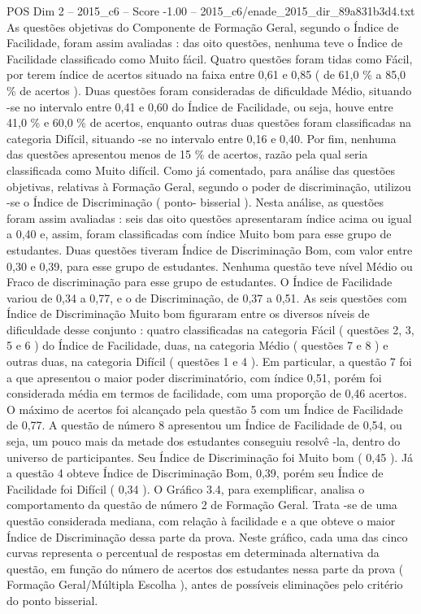 \begin{textsample}{POS Dim 2 – 2015\_c6 – Score -1.00 – 2015\_c6/enade\_2015\_dir\_89a831b3d4.txt}
As questões objetivas do Componente de Formação Geral, segundo o Índice de Facilidade, foram assim avaliadas : das oito questões, nenhuma teve o Índice de Facilidade classificado como Muito fácil.
Quatro questões foram tidas como Fácil, por terem índice de acertos situado na faixa entre 0,61 e 0,85 ( de 61,0 \% a 85,0 \% de acertos ).
Duas questões foram consideradas de dificuldade Médio, situando -se no intervalo entre 0,41 e 0,60 do Índice de Facilidade, ou seja, houve entre 41,0 \% e 60,0 \% de acertos, enquanto outras duas questões foram classificadas na categoria Difícil, situando -se no intervalo entre 0,16 e 0,40.
Por fim, nenhuma das questões apresentou menos de 15 \% de acertos, razão pela qual seria classificada como Muito difícil.
Como já comentado, para análise das questões objetivas, relativas à Formação Geral, segundo o poder de discriminação, utilizou -se o Índice de Discriminação ( ponto- bisserial ).
Nesta análise, as questões foram assim avaliadas : seis das oito questões apresentaram índice acima ou igual a 0,40 e, assim, foram classificadas com índice Muito bom para esse grupo de estudantes.
Duas questões tiveram Índice de Discriminação Bom, com valor entre 0,30 e 0,39, para esse grupo de estudantes.
Nenhuma questão teve nível Médio ou Fraco de discriminação para esse grupo de estudantes.
O Índice de Facilidade variou de 0,34 a 0,77, e o de Discriminação, de 0,37 a 0,51.
As seis questões com Índice de Discriminação Muito bom figuraram entre os diversos níveis de dificuldade desse conjunto : quatro classificadas na categoria Fácil ( questões 2, 3, 5 e 6 ) do Índice de Facilidade, duas, na categoria Médio ( questões 7 e 8 ) e outras duas, na categoria Difícil ( questões 1 e 4 ).
Em particular, a questão 7 foi a que apresentou o maior poder discriminatório, com índice 0,51, porém foi considerada média em termos de facilidade, com uma proporção de 0,46 acertos.
O máximo de acertos foi alcançado pela questão 5 com um Índice de Facilidade de 0,77.
A questão de número 8 apresentou um Índice de Facilidade de 0,54, ou seja, um pouco mais da metade dos estudantes conseguiu resolvê -la, dentro do universo de participantes.
Seu Índice de Discriminação foi Muito bom ( 0,45 ).
Já a questão 4 obteve Índice de Discriminação Bom, 0,39, porém seu Índice de Facilidade foi Difícil ( 0,34 ).
O Gráfico 3.4, para exemplificar, analisa o comportamento da questão de número 2 de Formação Geral.
Trata -se de uma questão considerada mediana, com relação à facilidade e a que obteve o maior Índice de Discriminação dessa parte da prova.
Neste gráfico, cada uma das cinco curvas representa o percentual de respostas em determinada alternativa da questão, em função do número de acertos dos estudantes nessa parte da prova ( Formação Geral/Múltipla Escolha ), antes de possíveis eliminações pelo critério do ponto bisserial.

\end{textsample}
